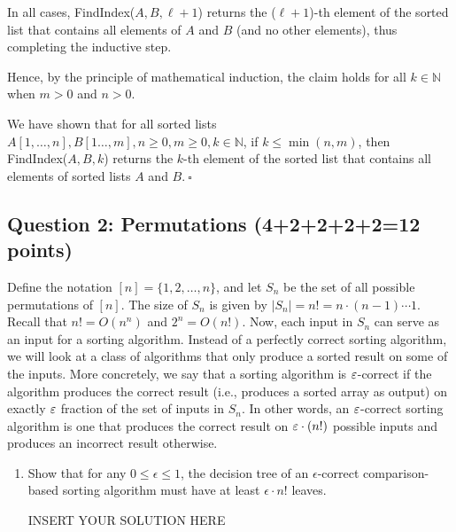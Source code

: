 \begin{solution}
\begin{itemize}
In all cases, {\sc FindIndex}($A,B,\ell+1$) returns the ($\ell+1$)-th element of the sorted list that contains all elements of $A$ and $B$ (and no other elements), thus completing the inductive step.

Hence, by the principle of mathematical induction, the claim holds for all $k\in\mathbb{N}$ when $m>0$ and $n>0$.
\end{itemize}

We have shown that for all sorted lists $A[1,\dots,n],B[1\dots,m],n\geq 0,m\geq 0,k\in\mathbb{N}$, if $k\leq\min(n,m)$, then {\sc FindIndex}($A,B,k$) returns the $k$-th element of the sorted list that contains all elements of sorted lists $A$ and $B$.$~\square$
\end{solution}
\subsection*{Question 2: Permutations (4+2+2+2+2=12 points)}

Define the notation $[n] = \{1, 2, \ldots, n\}$, and let $S_n$ be the set of all possible permutations of $[n]$. The size of $S_n$ is given by $|S_n|=n!=n\cdot (n-1) \cdots 1$. Recall that $n!=O(n^n)$ and $2^n=O(n!)$. 
Now, each input in $S_n$ can serve as an input for a sorting algorithm. Instead of a perfectly correct sorting algorithm, we will look at a class of algorithms that only produce a sorted result on some of the inputs. More concretely, we say that a sorting algorithm is $\varepsilon$-correct if the algorithm produces the correct result (i.e., produces a sorted array as output) on exactly $\varepsilon$ fraction of the set of inputs in $S_n$. In other words, an $\varepsilon$-correct sorting algorithm is one that produces the correct result on $\varepsilon \cdot (n!)$ possible inputs and produces an incorrect result otherwise.

\begin{enumerate}
    \item Show that for any $0\leq \epsilon\leq 1$, the decision tree of an $\epsilon$-correct comparison-based sorting algorithm must have at least $\epsilon \cdot n!$ leaves. 
\begin{solution}   INSERT YOUR SOLUTION HERE   \end{solution}
\end{enumerate}

